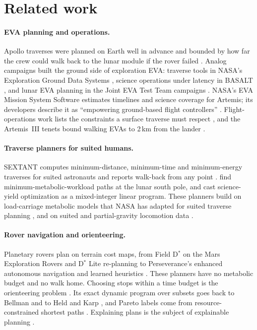 \section{Related work}
\label{sec:related}

\paragraph{EVA planning and operations.} Apollo traverses were planned on Earth well in advance and bounded by how far the crew could walk back to the lunar module if the rover failed \citep{benjamin1969apollo,norcross2009ewt}. Analog campaigns built the ground side of exploration EVA: traverse tools in NASA's Exploration Ground Data Systems \citep{lee2013xgds}, science operations under latency in BASALT \citep{lim2019basalt,beaton2019}, and lunar EVA planning in the Joint EVA Test Team campaigns \citep{caswell2023jett3}. NASA's EVA Mission System Software estimates timelines and science coverage for Artemis; its developers describe it as ``empowering ground-based flight controllers'' \citep{miller2026emss}. Flight-operations work lists the constraints a surface traverse must respect \citep{caswell2025eva}, and the Artemis~III tenets bound walking EVAs to 2\,km from the lander \citep{kagey2023tenets}.

\paragraph{Traverse planners for suited humans.} SEXTANT computes minimum-distance, minimum-time and minimum-energy traverses for suited astronauts and reports walk-back from any point \citep{johnson2010sextant,norheim2018sextant}.  find minimum-metabolic-workload paths at the lunar south pole, and \citet{broddrick2024} cast science-yield optimization as a mixed-integer linear program. These planners build on load-carriage metabolic models \citep{pandolf1977,santee2001} that NASA has adapted for suited traverse planning \citep{kim2024metabolic}, and on suited and partial-gravity locomotion data \citep{norcross2010level,norcross2010incline,carr2007framework,kluis2025}.

\paragraph{Rover navigation and orienteering.} Planetary rovers plan on terrain cost maps, from Field D$^\ast$ on the Mars Exploration Rovers \citep{ferguson2006,carsten2009} and D$^\ast$ Lite re-planning \citep{koenig2002dstar} to Perseverance's enhanced autonomous navigation \citep{toupet2026enav} and learned heuristics \citep{daftry2022}. These planners have no metabolic budget and no walk home. Choosing stops within a time budget is the orienteering problem \citep{golden1987,vansteenwegen2011,gunawan2016}. Its exact dynamic program over subsets goes back to Bellman and to Held and Karp \citep{bellman1962,heldkarp1962}, and Pareto labels come from resource-constrained shortest paths \citep{feillet2004,irnich2005}. Explaining plans is the subject of explainable planning \citep{chakraborti2020}.

